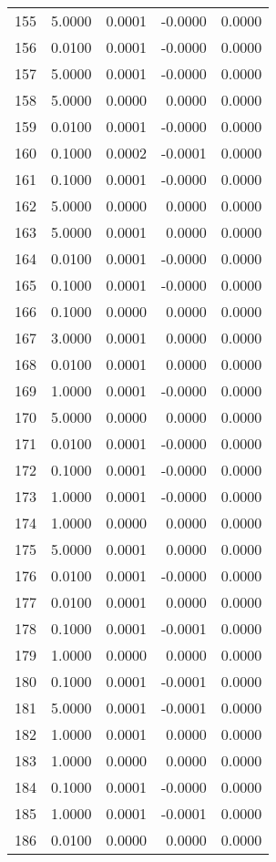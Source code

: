 \begin{longtable}{lrrrr}
155 & 5.0000 & 0.0001 & -0.0000 & 0.0000 \\
156 & 0.0100 & 0.0001 & -0.0000 & 0.0000 \\
157 & 5.0000 & 0.0001 & -0.0000 & 0.0000 \\
158 & 5.0000 & 0.0000 & 0.0000 & 0.0000 \\
159 & 0.0100 & 0.0001 & -0.0000 & 0.0000 \\
160 & 0.1000 & 0.0002 & -0.0001 & 0.0000 \\
161 & 0.1000 & 0.0001 & -0.0000 & 0.0000 \\
162 & 5.0000 & 0.0000 & 0.0000 & 0.0000 \\
163 & 5.0000 & 0.0001 & 0.0000 & 0.0000 \\
164 & 0.0100 & 0.0001 & -0.0000 & 0.0000 \\
165 & 0.1000 & 0.0001 & -0.0000 & 0.0000 \\
166 & 0.1000 & 0.0000 & 0.0000 & 0.0000 \\
167 & 3.0000 & 0.0001 & 0.0000 & 0.0000 \\
168 & 0.0100 & 0.0001 & 0.0000 & 0.0000 \\
169 & 1.0000 & 0.0001 & -0.0000 & 0.0000 \\
170 & 5.0000 & 0.0000 & 0.0000 & 0.0000 \\
171 & 0.0100 & 0.0001 & -0.0000 & 0.0000 \\
172 & 0.1000 & 0.0001 & -0.0000 & 0.0000 \\
173 & 1.0000 & 0.0001 & -0.0000 & 0.0000 \\
174 & 1.0000 & 0.0000 & 0.0000 & 0.0000 \\
175 & 5.0000 & 0.0001 & 0.0000 & 0.0000 \\
176 & 0.0100 & 0.0001 & -0.0000 & 0.0000 \\
177 & 0.0100 & 0.0001 & 0.0000 & 0.0000 \\
178 & 0.1000 & 0.0001 & -0.0001 & 0.0000 \\
179 & 1.0000 & 0.0000 & 0.0000 & 0.0000 \\
180 & 0.1000 & 0.0001 & -0.0001 & 0.0000 \\
181 & 5.0000 & 0.0001 & -0.0001 & 0.0000 \\
182 & 1.0000 & 0.0001 & 0.0000 & 0.0000 \\
183 & 1.0000 & 0.0000 & 0.0000 & 0.0000 \\
184 & 0.1000 & 0.0001 & -0.0000 & 0.0000 \\
185 & 1.0000 & 0.0001 & -0.0001 & 0.0000 \\
186 & 0.0100 & 0.0000 & 0.0000 & 0.0000 \\

\end{longtable}
